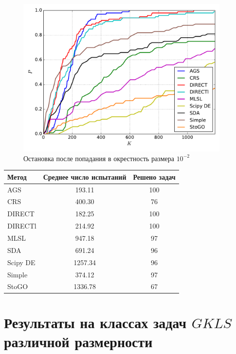 \documentclass[a4paper]{article}
\begin{document}
\begin{figure}[H]
  \center
  \includegraphics[width=0.95\textwidth]{../experiments/grish/cmc.pdf}
  \caption{Остановка после попадания в окрестность размера $10^{-2}$}
  \label{fig:}
\end{figure}

\begin{tabular}{lcc}
\hline
 Метод    &  Среднее число испытаний  &  Решено задач  \\
\hline
 AGS      &          193.11           &      100       \\
 CRS      &          400.30           &       76       \\
 DIRECT   &          182.25           &      100       \\
 DIRECTl  &          214.92           &      100       \\
 MLSL     &          947.18           &       97       \\
 SDA      &          691.24           &       96       \\
 Scipy DE &          1257.34          &       96       \\
 Simple   &          374.12           &       97       \\
 StoGO    &          1336.78          &       67       \\
\hline
\end{tabular}
\section{Результаты на классах задач $GKLS$ различной размерности}
\end{document}
